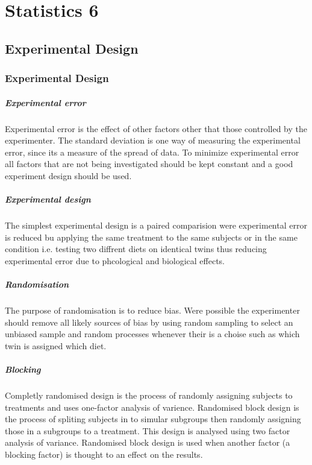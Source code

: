 \chapter{Statistics 6}

\newpage
\section{Experimental Design}

    \newpage
    \subsection{Experimental Design}
        \paragraph{Experimental error}
        Experimental error is the effect of other factors other that those controlled by the experimenter. The standard deviation is one way of measuring the experimental error, since its a measure of the spread of data. To minimize experimental error all factors that are not being investigated should be kept constant and a good experiment design should be used.

        \paragraph{Experimental design}
        The simplest experimental design is a paired comparision were experimental error is reduced bu applying the same treatment to the same subjects or in the same condition i.e. testing two diffrent diets on identical twins thus reducing experimental error due to phcological and biological effects.

        \paragraph{Randomisation}
        The purpose of randomisation is to reduce bias. Were possible the experimenter should remove all likely sources of bias by using random sampling to select an unbiased sample and random processes whenever their is a choise such as which twin is assigned which diet. 

        \paragraph{Blocking}
        Completly randomised design is the process of randomly assigning subjects to treatments and uses one-factor analysis of varience. Randomised block design is the process of spliting subjects in to simular subgroups then randomly assigning those in a subgroups to a treatment. This design is analysed using two factor analysis of variance. Randomised block design is used when another factor (a blocking factor) is thought to an effect on the results. 

